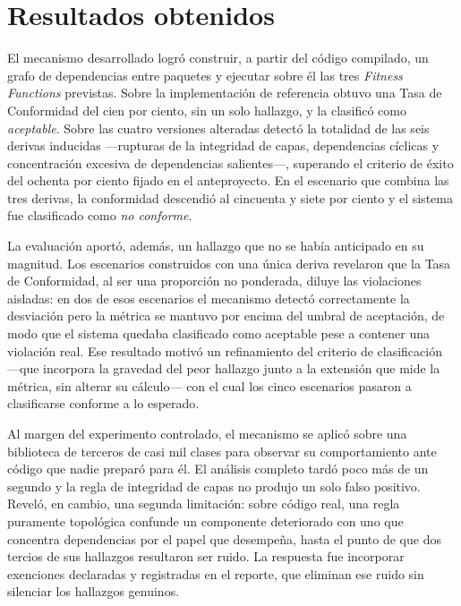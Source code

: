 \section{Resultados obtenidos}
El mecanismo desarrollado logró construir, a partir del código compilado, un grafo de dependencias entre paquetes y ejecutar sobre él las tres \textit{Fitness Functions} previstas. Sobre la implementación de referencia obtuvo una Tasa de Conformidad del cien por ciento, sin un solo hallazgo, y la clasificó como \textit{aceptable}. Sobre las cuatro versiones alteradas detectó la totalidad de las seis derivas inducidas —rupturas de la integridad de capas, dependencias cíclicas y concentración excesiva de dependencias salientes—, superando el criterio de éxito del ochenta por ciento fijado en el anteproyecto. En el escenario que combina las tres derivas, la conformidad descendió al cincuenta y siete por ciento y el sistema fue clasificado como \textit{no conforme}.

La evaluación aportó, además, un hallazgo que no se había anticipado en su magnitud. Los escenarios construidos con una única deriva revelaron que la Tasa de Conformidad, al ser una proporción no ponderada, diluye las violaciones aisladas: en dos de esos escenarios el mecanismo detectó correctamente la desviación pero la métrica se mantuvo por encima del umbral de aceptación, de modo que el sistema quedaba clasificado como aceptable pese a contener una violación real. Ese resultado motivó un refinamiento del criterio de clasificación —que incorpora la gravedad del peor hallazgo junto a la extensión que mide la métrica, sin alterar su cálculo— con el cual los cinco escenarios pasaron a clasificarse conforme a lo esperado.

Al margen del experimento controlado, el mecanismo se aplicó sobre una biblioteca de terceros de casi mil clases para observar su comportamiento ante código que nadie preparó para él. El análisis completo tardó poco más de un segundo y la regla de integridad de capas no produjo un solo falso positivo. Reveló, en cambio, una segunda limitación: sobre código real, una regla puramente topológica confunde un componente deteriorado con uno que concentra dependencias por el papel que desempeña, hasta el punto de que dos tercios de sus hallazgos resultaron ser ruido. La respuesta fue incorporar exenciones declaradas y registradas en el reporte, que eliminan ese ruido sin silenciar los hallazgos genuinos.

